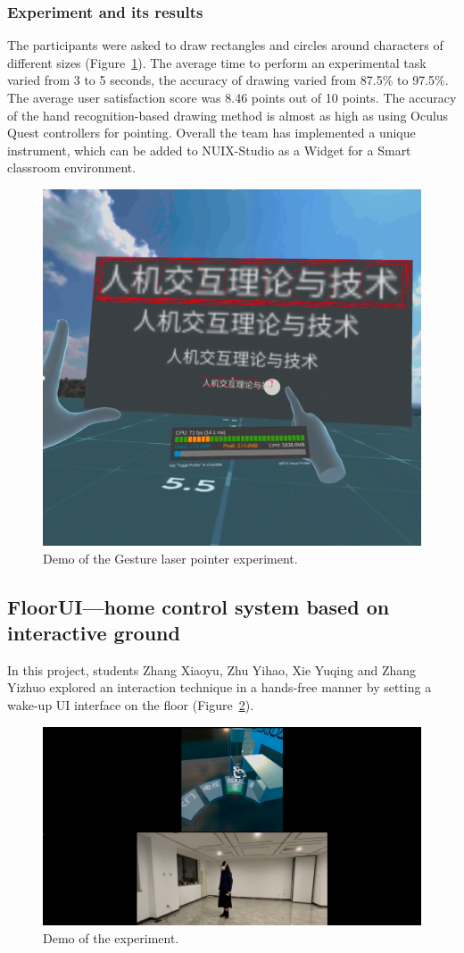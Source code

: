 \subsubsection{Experiment and its results}

The participants were asked to draw rectangles and circles around characters of different sizes (Figure~\ref{fig:Project9-figure}). The average time to perform an experimental task varied from 3 to 5 seconds, the accuracy of drawing varied from 87.5\% to 97.5\%. The average user satisfaction score was 8.46 points out of 10 points. The accuracy of the hand recognition-based drawing method is almost as high as using Oculus Quest controllers for pointing. Overall the team has implemented a unique instrument, which can be added to NUIX-Studio as a Widget for a Smart classroom environment.

\begin{figure}
  \centering
  \includegraphics[width=0.6\linewidth]{figures/Project_9.png}
  \caption{Demo of the Gesture laser pointer experiment.}
  \label{fig:Project9-figure}
\end{figure}

\subsection{FloorUI—home control system based on interactive ground}

In this project, students Zhang Xiaoyu, Zhu Yihao, Xie Yuqing and Zhang Yizhuo explored an interaction technique in a hands-free manner by setting a wake-up UI interface on the floor (Figure~\ref{fig:Project11-figure}). 

\begin{figure}
  \centering
  \includegraphics[width=0.9\linewidth]{figures/Project_11.png}
  \caption{Demo of the experiment.}
  \label{fig:Project11-figure}
\end{figure}

